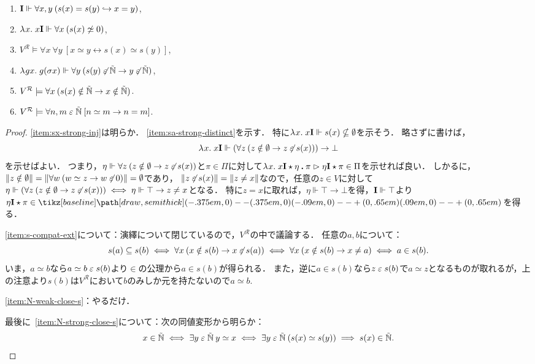 \documentclass[realisability.tex]{subfiles}
\begin{document}
\begin{lemma}\label{lem:s-0-compat}
 \begin{enumerate}
  \item \label{item:sx-strong-inj}$\mathsf{\mathbf{I}} \Vdash \forall x, y \: (s(x) = s(y) \hookrightarrow x = y)$,
  \item \label{item:sa-strong-distinct}$\lambda^{\mathsf{}}x.\;x\mathsf{\mathbf{I}} \Vdash \forall x \: (s(x) \not\simeq 0)$,
  \item \label{item:s-compat-ext}$V^{\mathcal{R}} \models \forall x\: \forall y \: [x \simeq y \leftrightarrow s(x) \simeq s(y)]$,
  \item \label{item:N-weak-close-s} $\lambda^{\mathsf{}}g x.\;g(\sigma x) \Vdash \forall y \: (s(y) \not\mathrel{\varepsilon} \mathord{\tilde{\mathbb{N}}} \to y \not\mathrel{\varepsilon} \mathord{\tilde{\mathbb{N}}}) $,
  \item \label{item:N-strong-close-s}$V^{\mathcal{R}} \models \forall x \: (s(x) \notin \mathord{\tilde{\mathbb{N}}} \to x \notin \mathord{\tilde{\mathbb{N}}})$.
  \item \label{item:nat-ext-to-int}$V^{\mathcal{R}} \models \forall n, m \mathrel{\varepsilon} \mathord{\tilde{\mathbb{N}}}\:[n \simeq m \to n = m]$.
 \end{enumerate}
\end{lemma}
\begin{proof}
 \ref{item:sx-strong-inj}は明らか．
 \ref{item:sa-strong-distinct}を示す．
 特に$\lambda^{\mathsf{}}x.\;x \mathsf{\mathbf{I}} \Vdash s(x) \nsubseteq \emptyset$を示そう．
 略さずに書けば，
 \[
  \lambda^{\mathsf{}}x.\;x \mathsf{\mathbf{I}} \Vdash (\forall z \: (z \notin \emptyset \to z \not\mathrel{\varepsilon} s(x))) \to \bot
 \]
 を示せばよい．
 つまり，$\eta \Vdash \forall z \: (z \notin \emptyset \to z \not\mathrel{\varepsilon} s(x))$と$\pi \in \Pi$に対して$\lambda^{\mathsf{}}x.\;x \mathsf{\mathbf{I}} \mathbin{\star} \eta \mathbin{\boldsymbol{.}} \pi \mathrel{\rhd} \eta \mathsf{\mathbf{I}} \mathbin{\star} \pi \in \Pi$を示せれば良い．
 しかるに，$\|z \notin \emptyset\| = \|\forall w\: (w \simeq z \to w \not\mathrel{\varepsilon} 0)\| = \emptyset$であり，
 $\|z \not\mathrel{\varepsilon} s(x)\| = \| z \neq x \|$なので，任意の$z \in V$に対して$\eta \Vdash (\forall z \: (z \notin \emptyset \to z \not\mathrel{\varepsilon} s(x))) \iff \eta \Vdash \top \to z \neq x$となる．
 特に$z = x$に取れば，$\eta \Vdash \top \to \bot$を得，$\mathsf{\mathbf{I}} \Vdash \top$より$\eta \I \cons \pi \in \pole$を得る．

 \ref{item:s-compat-ext}について：演繹について閉じているので，$V^{\mathcal{R}}$の中で議論する．
 任意の$a, b$について：
 \[ s(a) \subseteq s(b)
 \iff \forall x\: (x \notin s(b) \to x \not\mathrel{\varepsilon} s(a))
 \iff \forall x\: (x \notin s(b) \to x \neq a)
 \iff a \in s(b).
 \]
 いま，$a \simeq b$なら$a \simeq b \mathrel{\varepsilon} s(b)$より${\in}$の公理から$a \in s(b)$が得られる．
 また，逆に$a \in s(b)$なら$z \mathrel{\varepsilon} s(b)$で$a \simeq z$となるものが取れるが，上の注意より$s(b)$は$V^{\mathcal{R}}$において$b$のみしか元を持たないので$a \simeq b$.

 \ref{item:N-weak-close-s}：やるだけ．

 最後に~\ref{item:N-strong-close-s}について：次の同値変形から明らか：
 \[
       x \in \mathord{\tilde{\mathbb{N}}}
 \iff \exists y \mathrel{\varepsilon} \mathord{\tilde{\mathbb{N}}} \: y \simeq x
 \iff \exists y \mathrel{\varepsilon} \mathord{\tilde{\mathbb{N}}} \: (s(x) \simeq s(y))
 \implies s(x) \in \mathord{\tilde{\mathbb{N}}}.
 \]
\end{proof}
\end{document}
